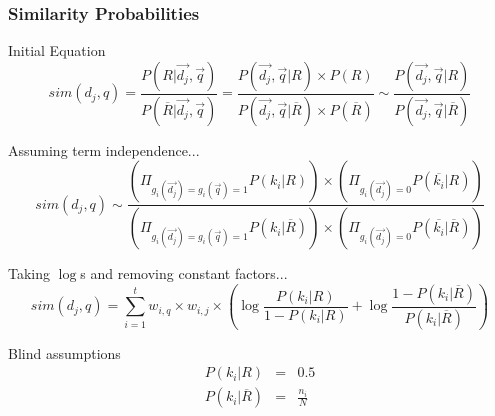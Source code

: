 \documentclass[svgnames]{beamer}
\begin{document}
\begin{frame}[allowframebreaks]
  \frametitle{Similarity Probabilities}

  \begin{block}{Initial Equation}
    \small
    \begin{displaymath}
        sim(d_j,q) = \frac{P(R|\vec{d_j},\vec{q})}{P(\overline{R}|\vec{d_j},\vec{q})}
        = \frac{P(\vec{d_j},\vec{q}|R) \times P(R)}{P(\vec{d_j},\vec{q}|\overline{R}) \times
          P(\overline{R})}
        \sim \frac{P(\vec{d_j},\vec{q}|R)}{P(\vec{d_j},\vec{q}|\overline{R})}
     \end{displaymath}
  \end{block}

  \begin{block}{Assuming term independence...}
    \small
    \begin{displaymath}
      sim(d_j,q) \sim \frac{
        (\Pi_{g_i(\vec{d_j})=g_i(\vec{q})=1}P(k_i|R))\times(\Pi_{g_i(\vec{d_j})=0}P(\overline{k_i}|R))
      }{
        (\Pi_{g_i(\vec{d_j})=g_i(\vec{q})=1}P(k_i|\overline{R}))\times(\Pi_{g_i(\vec{d_j})=0}P(\overline{k_i}|\overline{R}))}
    \end{displaymath}
  \end{block}

  \begin{block}{Taking $\log$s and removing constant factors...}
    \small
    \begin{displaymath}      
      sim(d_j,q) = \sum_{i=1}^t w_{i,q} \times w_{i,j} \times
      \left(
        \log\frac{P(k_i|R)}{1-P(k_i|R)} + \log\frac{1-P(k_i|\overline{R})}{P(k_i|\overline{R})}
      \right)
    \end{displaymath}
  \end{block}

  \begin{block}{Blind assumptions}
    \begin{displaymath}
      \begin{array}{rcl}
        P(k_i|R) &=& 0.5\\
        P(k_i|\overline{R}) &=& \frac{n_i}{N}\\
      \end{array}
    \end{displaymath}
  \end{block}


\end{frame}
\end{document}
